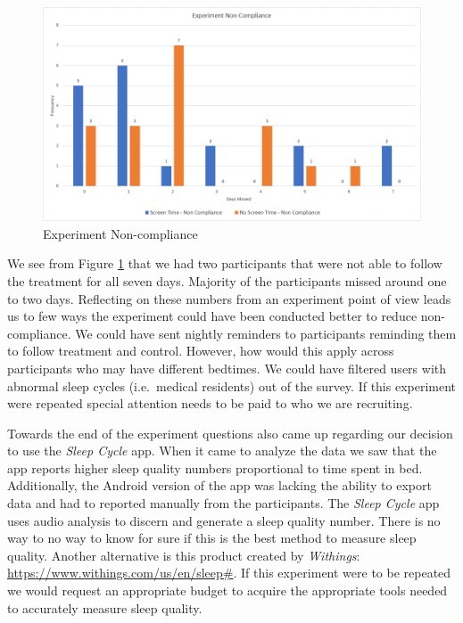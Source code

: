 \documentclass[12pt,]{article}
\begin{document}
\begin{figure}[H]

{\centering \includegraphics[width=1\linewidth]{img/compliance} 

}

\caption{Experiment Non-compliance}\label{fig:noncompliance}
\end{figure}

We see from Figure \ref{fig:noncompliance} that we had two participants
that were not able to follow the treatment for all seven days. Majority
of the participants missed around one to two days. Reflecting on these
numbers from an experiment point of view leads us to few ways the
experiment could have been conducted better to reduce non-compliance. We
could have sent nightly reminders to participants reminding them to
follow treatment and control. However, how would this apply across
participants who may have different bedtimes. We could have filtered
users with abnormal sleep cycles (i.e.~medical residents) out of the
survey. If this experiment were repeated special attention needs to be
paid to who we are recruiting.

Towards the end of the experiment questions also came up regarding our
decision to use the \emph{Sleep Cycle} app. When it came to analyze the
data we saw that the app reports higher sleep quality numbers
proportional to time spent in bed. Additionally, the Android version of
the app was lacking the ability to export data and had to reported
manually from the participants. The \emph{Sleep Cycle} app uses audio
analysis to discern and generate a sleep quality number. There is no way
to no way to know for sure if this is the best method to measure sleep
quality. Another alternative is this product created by \emph{Withings}:
\url{https://www.withings.com/us/en/sleep\#}. If this experiment were to
be repeated we would request an appropriate budget to acquire the
appropriate tools needed to accurately measure sleep quality.
\end{document}
